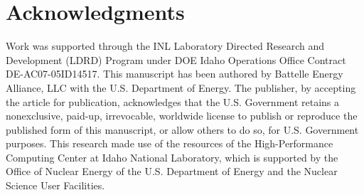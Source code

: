 \documentclass{anstrans}
\begin{document}
\section{Acknowledgments}
Work was supported through the INL Laboratory Directed Research and Development (LDRD) Program under DOE Idaho Operations Office Contract DE-AC07-05ID14517. This manuscript has been authored by Battelle Energy Alliance, LLC with the U.S. Department of Energy. The publisher, by accepting the article for publication, acknowledges that the U.S. Government retains a nonexclusive, paid-up, irrevocable, worldwide license to publish or reproduce the published form of this manuscript, or allow others to do so, for U.S. Government purposes. This research made use of the resources of the High-Performance Computing Center at Idaho National Laboratory, which is supported by the Office of Nuclear Energy of the U.S. Department of Energy and the Nuclear Science User Facilities.



\end{document}
